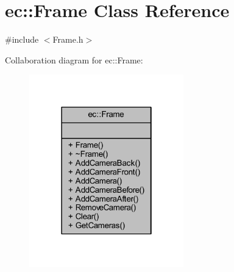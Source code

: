 \hypertarget{classec_1_1_frame}{}\section{ec\+:\+:Frame Class Reference}
\label{classec_1_1_frame}


{\ttfamily \#include $<$Frame.\+h$>$}



Collaboration diagram for ec\+:\+:Frame\+:\nopagebreak
\begin{figure}[H]
\begin{center}
\leavevmode
\includegraphics[width=190pt]{classec_1_1_frame__coll__graph}
\end{center}
\end{figure}
